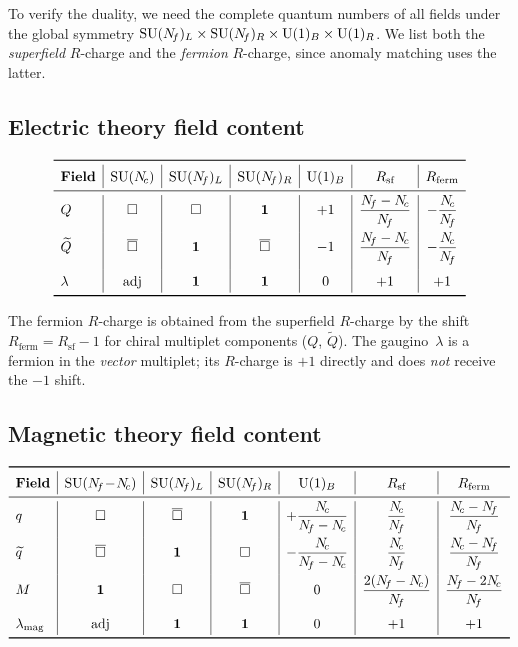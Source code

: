 \documentclass[11pt,a4paper]{article}
\begin{document}
To verify the duality, we need the complete quantum numbers of all fields
under the global symmetry $\mathrm{SU}(N_{\!f})_L \times \mathrm{SU}(N_{\!f})_R \times \mathrm{U}(1)_B
\times \mathrm{U}(1)_R$.  We list both the \emph{superfield} $R$-charge and the
\emph{fermion} $R$-charge, since anomaly matching uses the latter.

\subsection{Electric theory field content}

\begin{equation}\label{eq:electric-table}
\renewcommand{\arraystretch}{1.4}
\begin{array}{l|c|c|c|c|c|c}
\toprule
\textbf{Field} & \SU{\Nc} & \SU{\Nf}_L & \SU{\Nf}_R & \UU{1}_B
  & R_{\text{sf}} & R_{\text{ferm}} \\
\midrule
Q & \fund & \fund & \mathbf{1} & +1
  & \dfrac{\Nf - \Nc}{\Nf} & -\dfrac{\Nc}{\Nf} \\[8pt]
\widetilde{Q} & \antifund & \mathbf{1} & \antifund & -1
  & \dfrac{\Nf - \Nc}{\Nf} & -\dfrac{\Nc}{\Nf} \\[8pt]
\lambda & \adj & \mathbf{1} & \mathbf{1} & 0
  & +1 & +1 \\
\bottomrule
\end{array}
\end{equation}

The fermion $R$-charge is obtained from the superfield $R$-charge by the
shift $R_{\text{ferm}} = R_{\text{sf}} - 1$ for chiral multiplet components
($Q$, $\widetilde{Q}$).  The gaugino~$\lambda$ is a fermion in the
\emph{vector} multiplet; its $R$-charge is $+1$ directly and does
\emph{not} receive the $-1$ shift.

\subsection{Magnetic theory field content}

\begin{equation}\label{eq:magnetic-table}
\renewcommand{\arraystretch}{1.4}
\begin{array}{l|c|c|c|c|c|c}
\toprule
\textbf{Field} & \SU{\Nf\!-\!\Nc} & \SU{\Nf}_L & \SU{\Nf}_R & \UU{1}_B
  & R_{\text{sf}} & R_{\text{ferm}} \\
\midrule
q & \fund & \antifund & \mathbf{1}
  & +\dfrac{\Nc}{\Nf - \Nc}
  & \dfrac{\Nc}{\Nf}
  & \dfrac{\Nc - \Nf}{\Nf} \\[8pt]
\widetilde{q} & \antifund & \mathbf{1} & \fund
  & -\dfrac{\Nc}{\Nf - \Nc}
  & \dfrac{\Nc}{\Nf}
  & \dfrac{\Nc - \Nf}{\Nf} \\[8pt]
M & \mathbf{1} & \fund & \antifund & 0
  & \dfrac{2(\Nf - \Nc)}{\Nf}
  & \dfrac{\Nf - 2\Nc}{\Nf} \\[8pt]
\lambda_{\text{mag}} & \adj & \mathbf{1} & \mathbf{1} & 0
  & +1 & +1 \\
\bottomrule
\end{array}
\end{equation}
\end{document}
